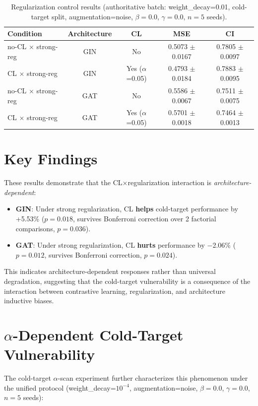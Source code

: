 \documentclass[10pt,a4paper]{article}
\begin{document}
\begin{table}[!h]
\caption{Regularization control results (authoritative batch: weight\_decay=0.01, cold-target split, augmentation=noise, $\beta=0.0$, $\gamma=0.0$, $n=5$ seeds).}
\label{tab:t4_results}
\centering
\begin{tabular}{lcccc}
\hline
\textbf{Condition} & \textbf{Architecture} & \textbf{CL} & \textbf{MSE} & \textbf{CI} \\
\hline
no-CL $\times$ strong-reg & GIN & No & 0.5073 $\pm$ 0.0167 & 0.7805 $\pm$ 0.0097 \\
CL $\times$ strong-reg & GIN & Yes ($\alpha$=0.05) & 0.4793 $\pm$ 0.0184 & 0.7883 $\pm$ 0.0095 \\
no-CL $\times$ strong-reg & GAT & No & 0.5586 $\pm$ 0.0067 & 0.7511 $\pm$ 0.0075 \\
CL $\times$ strong-reg & GAT & Yes ($\alpha$=0.05) & 0.5701 $\pm$ 0.0018 & 0.7464 $\pm$ 0.0013 \\
\hline
\end{tabular}
\end{table}

\section{Key Findings}

These results demonstrate that the CL$\times$regularization interaction is \textit{architecture-dependent}:
\begin{itemize}
\item \textbf{GIN}: Under strong regularization, CL \textbf{helps} cold-target performance by +5.53\% ($p=0.018$, survives Bonferroni correction over 2 factorial comparisons, $p=0.036$).
\item \textbf{GAT}: Under strong regularization, CL \textbf{hurts} performance by $-$2.06\% ($p=0.012$, survives Bonferroni correction, $p=0.024$).
\end{itemize}

This indicates architecture-dependent responses rather than universal degradation, suggesting that the cold-target vulnerability is a consequence of the interaction between contrastive learning, regularization, and architecture inductive biases.

\section{$\alpha$-Dependent Cold-Target Vulnerability}

The cold-target $\alpha$-scan experiment further characterizes this phenomenon under the unified protocol (weight\_decay=$10^{-4}$, augmentation=noise, $\beta=0.0$, $\gamma=0.0$, $n=5$ seeds):
\end{document}
